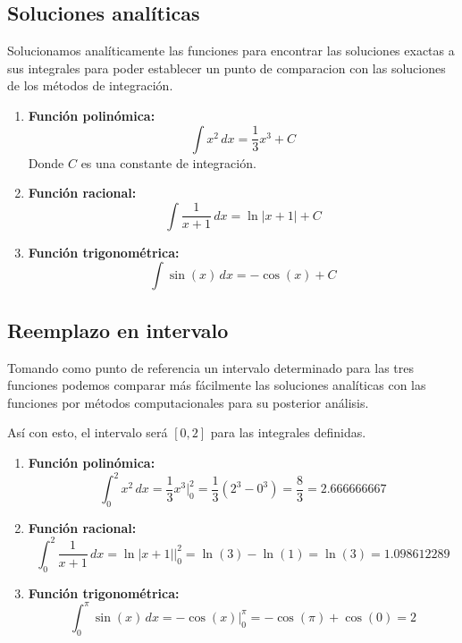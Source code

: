 \documentclass[a4paper]{article}
\begin{document}
    \subsection{Soluciones analíticas}
    Solucionamos analíticamente las funciones para encontrar las soluciones exactas a sus integrales para poder establecer un punto de comparacion con las soluciones de los métodos de integración.

    \begin{enumerate}
      \item \textbf{Función polinómica:}
      \begin{equation}
      \int x^2 \, dx = \frac{1}{3}x^3 + C
      \end{equation}
      Donde \(C\) es una constante de integración.

      \item \textbf{Función racional:}
      \begin{equation}
      \int \frac{1}{x + 1} \,dx = \ln|x + 1| + C 
      \end{equation}
    
      \item \textbf{Función trigonométrica:}
      \begin{equation}
      \int \sin(x) \, dx = -\cos(x) + C
      \end{equation}
    \end{enumerate}

    \subsection{Reemplazo en intervalo}

    Tomando como punto de referencia un intervalo determinado para las tres funciones podemos
    comparar más fácilmente las soluciones analíticas con las funciones por métodos computacionales para 
    su posterior análisis.

    Así con esto, el intervalo será \( [0, 2] \) para las integrales definidas.

    \begin{enumerate}
        \item \textbf{Función polinómica:}
        \begin{equation}
        \int_{0}^{2} x^2 \, dx = \frac{1}{3}x^3 \Big|_{0}^{2} = \frac{1}{3}(2^3 - 0^3) = \frac{8}{3} = 2.666666667
        \end{equation}
    
        \item \textbf{Función racional:}
        \begin{equation}
        \int_{0}^{2} \frac{1}{x + 1} \,dx = \ln|x + 1| \Big|_{0}^{2} = \ln(3) - \ln(1) = \ln(3) = 1.098612289
        \end{equation}
    
        \item \textbf{Función trigonométrica:}
        \begin{equation}
        \int_{0}^{\pi} \sin(x) \, dx = -\cos(x) \Big|_{0}^{\pi} = -\cos(\pi) + \cos(0) = 2
        \end{equation}
    \end{enumerate}
    
\end{document}
